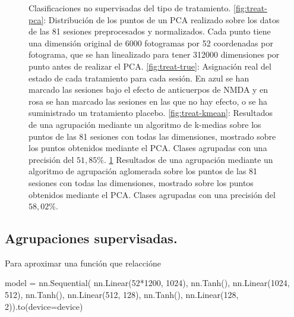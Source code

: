 \begin{figure}[p]
\begin{subfigure}{0.45\textwidth}
    \caption{}
    \label{fig:treat-agg}
  \end{subfigure}
  \caption[Clasificación no supervisada de tratamiento.]{Clasificaciones no supervisadas del tipo de tratamiento. \ref{fig:treat-pca}: Distribución de los puntos de un PCA realizado sobre los datos de las 81 sesiones preprocesados y normalizados. Cada punto tiene una dimensión original de 6000 fotogramas por 52 coordenadas por fotograma, que se han linealizado para tener 312000 dimensiones por punto antes de realizar el PCA. \ref{fig:treat-true}: Asignación real del estado de cada tratamiento para cada sesión. En azul se han marcado las sesiones bajo el efecto de anticuerpos de NMDA y en rosa se han marcado las sesiones en las que no hay efecto, o se ha suministrado un tratamiento placebo. \ref{fig:treat-kmean}: Resultados de una agrupación mediante un algoritmo de k-medias sobre los puntos de las 81 sesiones con todas las dimensiones, mostrado sobre los puntos obtenidos mediante el PCA. Clases agrupadas con una precisión del $ 51,85\% $. \ref{fig:treat-agg} Resultados de una agrupación mediante un algoritmo de agrupación aglomerada sobre los puntos de las 81 sesiones con todas las dimensiones, mostrado sobre los puntos obtenidos mediante el PCA. Clases agrupadas con una precisión del $ 58,02\% $.}
  \label{fig:unsupervied-treatment}
\end{figure}



\newpage
\subsection{Agrupaciones supervisadas.}

Para aproximar una función que relaccióne 

\begin{mypython}[float={h}, caption=Red secuencial]
model = nn.Sequential(
          nn.Linear(52*1200, 1024),
          nn.Tanh(),
          nn.Linear(1024, 512),
          nn.Tanh(),
          nn.Linear(512, 128),
          nn.Tanh(),
          nn.Linear(128, 2)).to(device=device)
\end{mypython}

